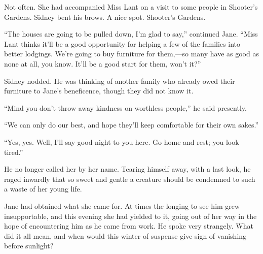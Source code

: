 Not often. She had accompanied Miss Lant on a visit to some people in
Shooter's Gardens. Sidney bent his brows. A nice spot. Shooter's
Gardens.

``The houses are going to be pulled down, I'm glad to say,'' continued
Jane. ``Miss Lant thinks it'll be a good opportunity for helping a few
of the families into better lodgings. We're going to buy furniture for
them,---so many have as good as none at all, you
{\protect\hypertarget{23}{}{}}know. It'll be a good start for them,
won't it?''

Sidney nodded. He was thinking of another family who already owed their
furniture to Jane's beneficence, though they did not know it.

``Mind you don't throw away kindness on worthless people,'' he said
presently.

``We can only do our best, and hope they'll keep comfortable for their
own sakes.''

``Yes, yes. Well, I'll say good-night to you here. Go home and rest; you
look tired.''

He no longer called her by her name. Tearing himself away, with a last
look, he raged inwardly that so sweet and gentle a creature should be
condemned to such a waste of her young life.

Jane had obtained what she came for. At times the longing to see him
grew insupportable, and this evening she had yielded to it, going out of
her way in the hope of encountering him as he came from work. He spoke
very strangely. What did it all mean, and when would this winter of
suspense give sign of vanishing before sunlight?
